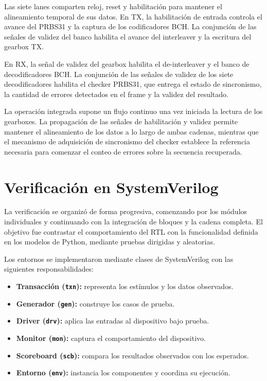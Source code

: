 \documentclass[10pt,a4paper]{article}
\begin{document}
Las siete lanes comparten reloj, reset y habilitación
para mantener el alineamiento temporal de sus datos.
En TX, la habilitación de entrada controla el avance
del PRBS31 y la captura de los codificadores BCH.
La conjunción de las señales de validez del banco
habilita el avance del interleaver y la escritura
del gearbox TX.

En RX, la señal de validez del gearbox habilita el
de-interleaver y el banco de decodificadores BCH.
La conjunción de las señales de validez de los
siete decodificadores habilita el checker PRBS31,
que entrega el estado de sincronismo, la cantidad
de errores detectados en el frame y la validez
del resultado.

La operación integrada supone un flujo continuo
una vez iniciada la lectura de los gearboxes.
La propagación de las señales de habilitación
y validez permite mantener el alineamiento de
los datos a lo largo de ambas cadenas, mientras
que el mecanismo de adquisición de sincronismo
del checker establece la referencia necesaria
para comenzar el conteo de errores sobre la
secuencia recuperada.
\section{Verificación en SystemVerilog}

La verificación se organizó de forma progresiva, comenzando por los
módulos individuales y continuando con la integración de bloques y
la cadena completa. El objetivo fue contrastar el comportamiento del
RTL con la funcionalidad definida en los modelos de Python, mediante
pruebas dirigidas y aleatorias.

Los entornos se implementaron mediante clases de SystemVerilog con
las siguientes responsabilidades:

\begin{itemize}
    \item \textbf{Transacción (\texttt{txn}):} representa los estímulos
    y los datos observados.
    \item \textbf{Generador (\texttt{gen}):} construye los casos de prueba.
    \item \textbf{Driver (\texttt{drv}):} aplica las entradas al
    dispositivo bajo prueba.
    \item \textbf{Monitor (\texttt{mon}):} captura el comportamiento
    del dispositivo.
    \item \textbf{Scoreboard (\texttt{scb}):} compara los resultados
    observados con los esperados.
    \item \textbf{Entorno (\texttt{env}):} instancia los componentes
    y coordina su ejecución.
\end{itemize}
\end{document}
